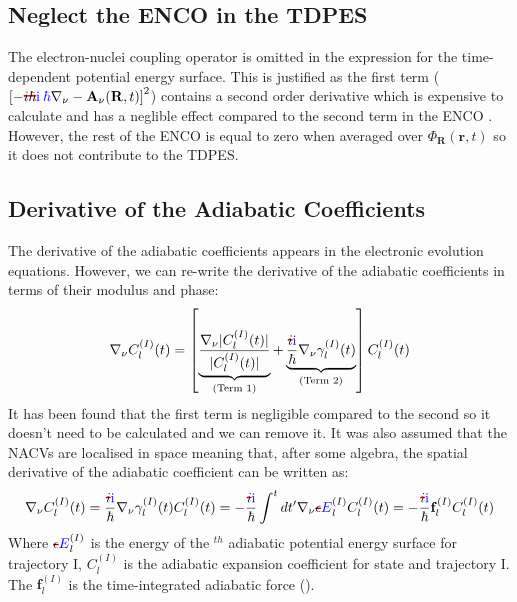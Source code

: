 \subsection{Neglect the ENCO in the TDPES}
The electron-nuclei coupling operator is omitted in the expression for the time-dependent potential energy surface. This is justified as the first term ($\left[-\mremove{i \hbar}\madd{\im \: \hbar} \nabla_{\nu} - \mathbf{A}_{\nu}(\mathbf{R}, t) \right]^2$) contains a second order derivative which is expensive to calculate and has a neglible effect compared to the second term in the ENCO \cite{Scherrer2015Aug}. However, the rest of the ENCO is equal to zero when averaged over $\Phi_{\mathbf{R}}(\mathbf{r},t)$ so it does not contribute to the TDPES.
\subsection{Derivative of the Adiabatic Coefficients}
The derivative of the adiabatic coefficients appears in the electronic evolution equations. However, we can re-write the derivative of the adiabatic coefficients in terms of their modulus and phase:
\begin{equation}
	\nabla_{\nu} C_{l}^{(I)}(t) = \left[ \underbrace{\frac{\nabla_{\nu} |C_{l}^{(I)}(t)|}{|C_{l}^{(I)}(t)|}}_{(\text{Term 1})} + \underbrace{\frac{\mremove{i}\madd{\im}}{\hbar} \nabla_{\nu} \gamma_{l}^{(I)}(t)}_{(\text{Term 2})}\right] C_{l}^{(I)}(t)
\end{equation}
It has been found that the first term is negligible compared to the second \cite{abedi_dynamical_2013, agostini_mixed_2013, agostini_exact_2015} so it doesn't need to be calculated and we can remove it. It was also assumed that the NACVs are localised in space meaning that, after some algebra, the spatial derivative of the adiabatic coefficient can be written as:
\begin{equation}
	\nabla_{\nu} C_{l}^{(I)}(t) = \frac{\mremove{i}\madd{\im}}{\hbar} \nabla_{\nu} \gamma_{l}^{(I)}(t) C_{l}^{(I)}(t) = -\frac{\mremove{i}\madd{\im}}{\hbar} \int^{t} dt' \nabla_{\nu} \mremove{\epsilon}\madd{E}_{l}^{(I)} C_{l}^{(I)}(t) = -\frac{\mremove{i}\madd{\im}}{\hbar} \mathbf{f}_{l}^{(I)} C_{l}^{(I)}(t)
  \label{eq:hist_force}
\end{equation}
Where $\mremove{\epsilon}\madd{E}_{l}^{(I)}$ is the energy of the $^{th}$ adiabatic potential energy surface for trajectory I, $C_{l}^{(I)}$ is the adiabatic expansion coefficient for state  and trajectory I. The $\mathbf{f}_{l}^{(I)}$ is the time-integrated adiabatic force ().
